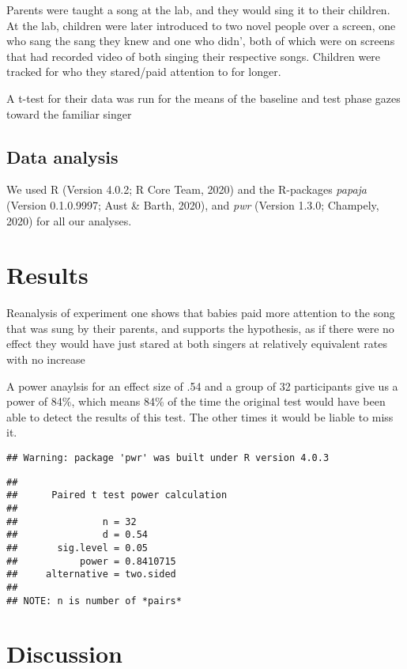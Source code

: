 \documentclass[
  english,
  man]{apa6}
\begin{document}
Parents were taught a song at the lab, and they would sing it to their children. At the lab, children were later introduced to two novel people over a screen, one who sang the sang they knew and one who didn', both of which were on screens that had recorded video of both singing their respective songs. Children were tracked for who they stared/paid attention to for longer.

A t-test for their data was run for the means of the baseline and test phase gazes toward the familiar singer

\hypertarget{data-analysis}{%
\subsection{Data analysis}\label{data-analysis}}

We used R (Version 4.0.2; R Core Team, 2020) and the R-packages \emph{papaja} (Version 0.1.0.9997; Aust \& Barth, 2020), and \emph{pwr} (Version 1.3.0; Champely, 2020) for all our analyses.

\hypertarget{results}{%
\section{Results}\label{results}}

Reanalysis of experiment one shows that babies paid more attention to the song that was sung by their parents, and supports the hypothesis, as if there were no effect they would have just stared at both singers at relatively equivalent rates with no increase

A power anaylsis for an effect size of .54 and a group of 32 participants give us a power of 84\%, which means 84\% of the time the original test would have been able to detect the results of this test. The other times it would be liable to miss it.

\begin{verbatim}
## Warning: package 'pwr' was built under R version 4.0.3
\end{verbatim}

\begin{verbatim}
## 
##      Paired t test power calculation 
## 
##               n = 32
##               d = 0.54
##       sig.level = 0.05
##           power = 0.8410715
##     alternative = two.sided
## 
## NOTE: n is number of *pairs*
\end{verbatim}

\hypertarget{discussion}{%
\section{Discussion}\label{discussion}}
\end{document}
